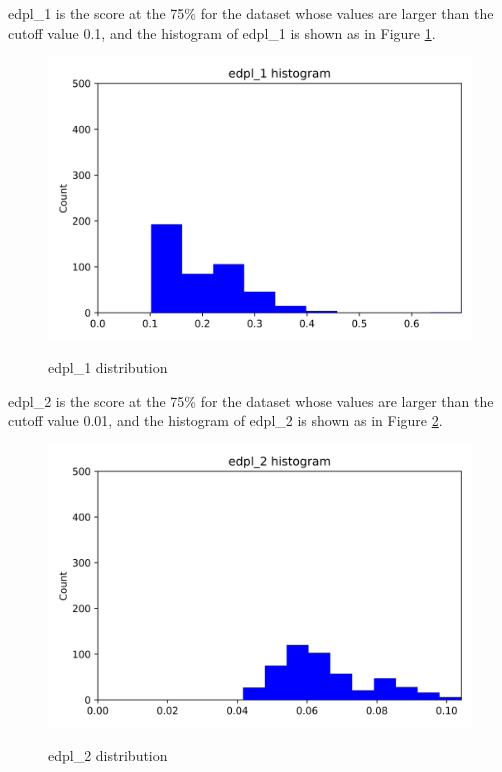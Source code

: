 \documentclass{article}
\begin{document}
edpl_1 is the score at the 75\% for the dataset whose values are larger than the cutoff value 0.1, and the histogram of edpl_1 is shown as in Figure \ref{edpl_1-communitylevel}. \par
\begin{figure}[H]
	\centering
	\includegraphics[width=\textwidth, keepaspectratio]{edpl_1-communitylevel.png}\\
	\caption{edpl_1 distribution}
	\label{edpl_1-communitylevel}
\end{figure}
edpl_2 is the score at the 75\% for the dataset whose values are larger than the cutoff value 0.01, and the histogram of edpl_2 is shown as in Figure  \ref{edpl_2-communitylevel}. \par
\begin{figure}[H]
	\centering
	\includegraphics[width=\textwidth, keepaspectratio]{edpl_2-communitylevel.png}\\
	\caption{edpl_2 distribution}
	\label{edpl_2-communitylevel}
\end{figure}
\end{document}
